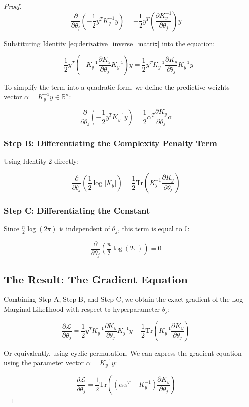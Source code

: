 \documentclass[12pt,oneside]{report}
\theoremstyle{definition}
\theoremstyle{remark}
\begin{document}
\begin{proof}
$$\frac{\partial}{\partial \theta_j} \left( -\frac{1}{2} y^T K_y^{-1} y \right) = -\frac{1}{2} y^T \left( \frac{\partial K_y^{-1}}{\partial \theta_j} \right) y$$

Substituting Identity \ref{eq:derivative_inverse_matrix} into the equation:

$$-\frac{1}{2} y^T \left( -K_y^{-1} \frac{\partial K_y}{\partial \theta_j} K_y^{-1} \right) y = \frac{1}{2} y^T K_y^{-1} \frac{\partial K_y}{\partial \theta_j} K_y^{-1} y$$

To simplify the term into a quadratic form, we define the predictive weights vector $\alpha = K_y^{-1} y \in \mathbb{R}^n$:

$$\frac{\partial}{\partial \theta_j} \left( -\frac{1}{2} y^T K_y^{-1} y \right) = \frac{1}{2} \alpha^T \frac{\partial K_y}{\partial \theta_j} \alpha$$

\subsubsection{Step B: Differentiating the Complexity Penalty Term}

Using Identity 2 directly:

$$\frac{\partial}{\partial \theta_j} \left( \frac{1}{2} \log \vert{}K_y\vert{} \right) = \frac{1}{2} \text{Tr}\left( K_y^{-1} \frac{\partial K_y}{\partial \theta_j} \right)$$

\subsubsection{Step C: Differentiating the Constant}

Since $\frac{n}{2} \log(2\pi)$ is independent of $\theta_j$, this term is equal to $0$:

$$\frac{\partial}{\partial \theta_j} \left( \frac{n}{2} \log (2\pi) \right) = 0$$

\subsection{The Result: The Gradient Equation}

Combining Step A, Step B, and Step C, we obtain the exact gradient of the Log-Marginal Likelihood with respect to hyperparameter $\theta_j$:

\begin{equation}
\frac{\partial \mathcal{L}}{\partial \theta_j} = \frac{1}{2} y^T K_y^{-1} \frac{\partial K_y}{\partial \theta_j} K_y^{-1} y - \frac{1}{2} \text{Tr}\left( K_y^{-1} \frac{\partial K_y}{\partial \theta_j} \right)
\label{eq:gradient_equation}
\end{equation}

Or equivalently, using cyclic permutation. We can express the gradient equation using the parameter vector $\alpha = K_y^{-1} y$:

$$\frac{\partial \mathcal{L}}{\partial \theta_j} = \frac{1}{2} \text{Tr} \left( \left( \alpha \alpha^T - K_y^{-1} \right) \frac{\partial K_y}{\partial \theta_j} \right)$$

\end{proof}
\end{document}
